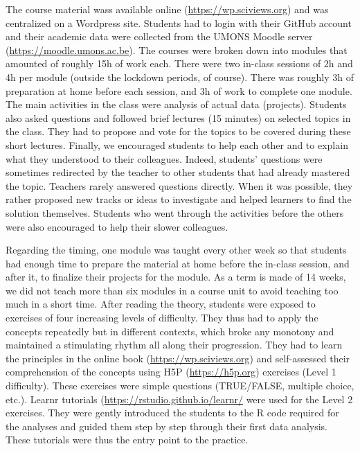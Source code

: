\documentclass{aims}
\theoremstyle{definition}
\begin{document}
The course material wass available online
(\url{https://wp.sciviews.org}) and was centralized on a Wordpress site.
Students had to login with their GitHub account and their academic data
were collected from the UMONS Moodle server
(\url{https://moodle.umons.ac.be}). The courses were broken down into
modules that amounted of roughly 15h of work each. There were two
in-class sessions of 2h and 4h per module (outside the lockdown periods,
of course). There was roughly 3h of preparation at home before each
session, and 3h of work to complete one module. The main activities in
the class were analysis of actual data (projects). Students also asked
questions and followed brief lectures (15 minutes) on selected topics in
the class. They had to propose and vote for the topics to be covered
during these short lectures. Finally, we encouraged students to help
each other and to explain what they understood to their colleagues.
Indeed, students' questions were sometimes redirected by the teacher to
other students that had already mastered the topic. Teachers rarely
answered questions directly. When it was possible, they rather proposed
new tracks or ideas to investigate and helped learners to find the
solution themselves. Students who went through the activities before the
others were also encouraged to help their slower colleagues.

Regarding the timing, one module was taught every other week so that
students had enough time to prepare the material at home before the
in-class session, and after it, to finalize their projects for the
module. As a term is made of 14 weeks, we did not teach more than six
modules in a course unit to avoid teaching too much in a short time.
After reading the theory, students were exposed to exercises of four
increasing levels of difficulty. They thus had to apply the concepts
repeatedly but in different contexts, which broke any monotony and
maintained a stimulating rhythm all along their progression. They had to
learn the principles in the online book (\url{https://wp.sciviews.org})
and self-assessed their comprehension of the concepts using H5P
(\url{https://h5p.org}) exercises (Level 1 difficulty). These exercises
were simple questions (TRUE/FALSE, multiple choice, etc.). Learnr
tutorials (\url{https://rstudio.github.io/learnr/} were used for the
Level 2 exercises. They were gently introduced the students to the R
code required for the analyses and guided them step by step through
their first data analysis. These tutorials were thus the entry point to
the practice.
\end{document}
